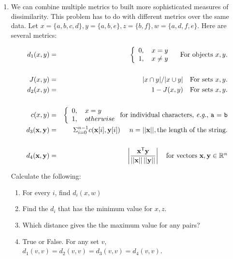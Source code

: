 \documentclass{article}
\begin{document}
\begin{enumerate}
\item  We can combine multiple metrics to built more sophisticated measures of dissimilarity. This problem has to do with different metrics over the same data.  Let  $x = \{a,b,c,d\}, y = \{a, b, e\}, z = \{b, f\}, w = \{a,d,f,e\}$.  Here are several metrics:

 \begin{eqnarray*}
 d_1(x,y) &=& \left\{\begin{array}{l} 0,\ \ \ x = y \\ 1,\ \ \  x\neq y \end{array}\right.\ \ \ \mbox{For objects $x,y$}. \\
 &&\\
 J(x,y) &=&|x \cap y|/|x \cup y|\ \ \ \mbox{\rm For sets $x,y$.} \\   d_2(x,y) &=& 1-J(x,y)\ \ \ \mbox{\rm For sets $x,y$.}\\
 &&\\
c(x,y) &=& \left\{\begin{array}{l}0, \ \ \ x = y\\ 1, \ \ \ otherwise\end{array}\right. \mbox{\rm for individual characters, {\it e.g.}, \texttt{a} = \texttt{b}}\\
d_3(\mathrm{\bf x},\mathrm{\bf y}) &=& \Sigma_{i=0}^{n-1}c(\mathrm{\bf x}[i], \mathrm{\bf y}[i]) \ \ \ \ n = ||\mathrm{\bf x}||, \mbox{\rm the length of the string.}\\
&&\\
d_4(\mathbf{x},\mathbf{y}) &=& \left|{\frac{\mathbf{x}^{\mathsf{T}}\mathbf{y}}{||\mathbf{x}||\,||\mathbf{y}||}}\right| \ \ \ \mbox{\rm for vectors $\mathbf{x}, \mathbf{y} \in \mathbb{R}^n$} 
 \end{eqnarray*}

Calculate the following:
\begin{enumerate} \item For every $i$, find $d_i(x,w)$ \item Find the $d_i$ that has the minimum value for $x,z$.  \item Which distance gives the the maximum value for any pairs?  \item \textsf{True or False}.  For any set $v$, $d_1(v,v) = d_2(v,v) = d_3(v,v) = d_4(v,v)$. \end{enumerate}


\end{enumerate}
\end{document}
